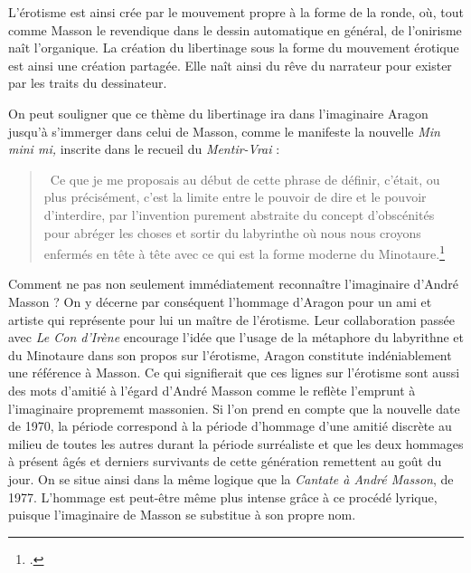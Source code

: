 	 L'érotisme est ainsi crée par le mouvement propre à la forme de la ronde, où, tout comme Masson le revendique dans le dessin automatique en général, de l'onirisme naît l'organique. La création du libertinage sous la forme du mouvement érotique est ainsi une création partagée. Elle naît ainsi du rêve du narrateur pour exister par les traits du dessinateur. 

On peut souligner que ce thème du libertinage ira dans l'imaginaire Aragon jusqu'à s'immerger dans celui de Masson, comme le manifeste la nouvelle \emph{Min mini mi,} inscrite dans le recueil du \emph{Mentir-Vrai} :

	 \begin{quote}
	 Ce que je me proposais au début de cette phrase de définir, c’était, ou plus précisément, c’est la limite entre le pouvoir de dire et le pouvoir d’interdire, par l’invention purement abstraite du concept d’obscénités pour abréger les choses et sortir du labyrinthe où nous nous croyons enfermés en tête à tête avec ce qui est la forme moderne du Minotaure.\footcite[p494]{mentirvrai}\end{quote}

	 Comment ne pas non seulement immédiatement reconnaître l'imaginaire d'André Masson ? On y décerne par conséquent l'hommage d'Aragon pour un ami et artiste qui représente pour lui un maître de l'érotisme. Leur collaboration passée avec \emph{Le Con d'Irène} encourage l'idée que l'usage de la métaphore du labyrithne et du Minotaure dans son propos sur l'érotisme, Aragon constitute indéniablement une référence à Masson. Ce qui signifierait que ces lignes sur l'érotisme sont aussi des mots d'amitié à l'égard d'André Masson comme le reflète l'emprunt à l'imaginaire proprememt massonien. Si l'on prend en compte que la nouvelle date de 1970, la période correspond à la période d'hommage d'une amitié discrète au milieu de toutes les autres durant la période surréaliste et que les deux hommages à présent âgés et derniers survivants de cette génération remettent au goût du jour. On se situe ainsi dans la même logique que la \emph{Cantate à André Masson}, de 1977. L'hommage est peut-être même plus intense grâce à ce procédé lyrique, puisque l'imaginaire de Masson se substitue à son propre nom.
	 
